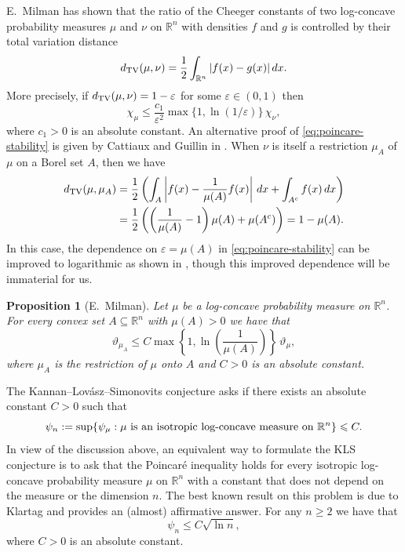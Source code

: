 \documentclass[11pt,leqno]{article}
\newtheorem{proposition}[theorem]{Proposition}
\theoremstyle{definition}
\theoremstyle{remark}
\numberwithin{equation}{section}
\newcommand{\ls}{\leqslant}
\newcommand{\gr}{\geqslant}
\newcommand{\1}{\textbf{1}}
\newcommand{\e}{\varepsilon}
\def\e{\varepsilon}
\begin{document}
E.~Milman \cite[Theorem~5.5]{EMilman-2009} has shown that the ratio of the Cheeger constants of two log-concave probability measures $\mu$ and $\nu$
on $\mathbb{R}^n$ with densities $f$ and $g$ is controlled by their total variation distance
$$d_{{\rm TV}}(\mu,\nu)=\frac{1}{2}\int_{\mathbb{R}^n}|f(x)-g(x)|\,dx.$$
More precisely, if $d_{{\rm TV}}(\mu,\nu)= 1-\varepsilon$ for some $\varepsilon\in (0,1)$ then
\begin{equation}\label{eq:poincare-stability}\chi_{\mu}\ls \frac{c_1}{\varepsilon^2}\max\{1,\ln(1/\varepsilon)\}\,\chi_{\nu},\end{equation}
where $c_1>0$ is an absolute constant. An alternative proof of \eqref{eq:poincare-stability} is given by Cattiaux and Guillin in
\cite[Theorem~9.3.10]{Cattiaux-Guillin-2020}. When $\nu$ is itself a restriction $\mu_A$ of $\mu$ on a Borel set $A$, then we have
\begin{align*}
d_{{\rm TV}}(\mu,\mu_A) &=\frac{1}{2}\left(\int_A\left|f(x)-\frac{1}{\mu(A)}f(x)\right|\,dx+\int_{A^c}f(x)\,dx\right)\\
&=\frac{1}{2}\left(\left(\frac{1}{\mu(A)}-1\right)\mu(A)+\mu(A^c)\right)=1-\mu(A).
\end{align*}
In this case, the dependence on $\e=\mu(A)$ in \eqref{eq:poincare-stability} can be improved to logarithmic as shown in \cite[Lemmas~5.1 and 5.4]{EMilman-2009}, though this improved dependence will be immaterial for us.



\begin{proposition} [E.~Milman]\label{prop:theta-stability}Let $\mu $ be a log-concave probability measure on $\mathbb{R}^n$. For every convex
set $A\subseteq\mathbb{R}^n$ with $\mu(A)>0$ we have that
\begin{equation}\label{eq:theta-stability-1}\vartheta_{\mu_A}\ls C \max\left\{1,\ln\left(\frac{1}{\mu(A)}\right)\right\}\,\vartheta_{\mu},\end{equation}
where $\mu_A$ is the restriction of $\mu$ onto $A$ and $C>0$ is an absolute constant. 
\end{proposition}

The Kannan--Lov\'{a}sz--Simonovits conjecture asks if there exists an absolute constant $C>0$ such that
\begin{equation*}\psi_n:=\sup\{ \psi_{\mu }:\mu\ \hbox{is an isotropic log-concave measure on}\ {\mathbb
R}^n\}\ls C.\end{equation*}
In view of the discussion above, an equivalent way to formulate the KLS conjecture is to ask that the Poincar\'{e} inequality
holds for every isotropic log-concave probability measure $\mu$ on ${\mathbb R}^n$ with a constant
that does not depend on the measure or the dimension $n$. The best known result on this problem is due to Klartag \cite{Klartag-2023} and 
provides an (almost) affirmative answer. For any $n\gr 2$ we have that
$$\psi_n\ls C\sqrt{\ln n},$$
where $C>0$ is an absolute constant.
\end{document}
